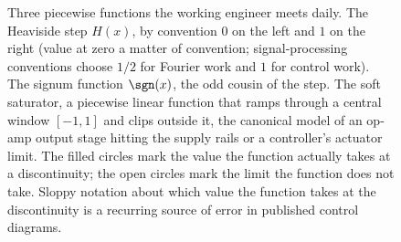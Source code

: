 \begin{figure}[htbp]
{\begin{tikzpicture}
\end{tikzpicture}%
}%
\caption[Piecewise definitions assembled from elementary pieces]{Three
piecewise functions the working engineer meets daily. The Heaviside
step $H(x)$, by convention $0$ on the left and $1$ on the right
(value at zero a matter of convention; signal-processing conventions
choose $1/2$ for Fourier work and $1$ for control work). The signum
function $\sgn(x)$, the odd cousin of the step. The soft saturator,
a piecewise linear function that ramps through a central window
$[-1, 1]$ and clips outside it, the canonical model of an op-amp
output stage hitting the supply rails or a controller's actuator
limit. The filled circles mark the value the function actually takes
at a discontinuity; the open circles mark the limit the function
does not take. Sloppy notation about which value the function takes
at the discontinuity is a recurring source of error in published
control diagrams.}
\label{fig:vol02:ch02:piecewise-step}
\end{figure}
